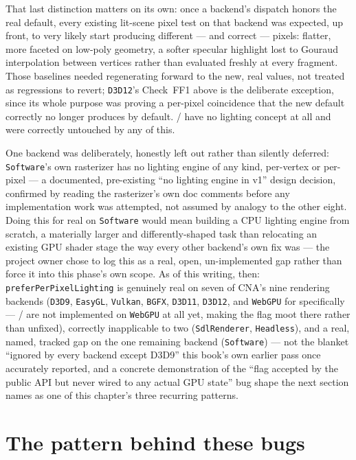 That last distinction matters on its own: once a backend's dispatch honors the real default,
every existing lit-scene pixel test on that backend was expected, up front, to very likely start
producing different --- and correct --- pixels: flatter, more faceted on low-poly geometry, a
softer specular highlight lost to Gouraud interpolation between vertices rather than evaluated
freshly at every fragment. Those baselines needed regenerating forward to the new, real values,
not treated as regressions to revert; \texttt{D3D12}'s Check~FF1 above is the deliberate
exception, since its whole purpose was proving a per-pixel coincidence that the new default
correctly no longer produces by default.  / 
have no lighting concept at all and were correctly untouched by any of this.

One backend was deliberately, honestly left out rather than silently deferred:
\texttt{Software}'s own rasterizer has no lighting engine of any kind, per-vertex or per-pixel
--- a documented, pre-existing ``no lighting engine in v1'' design decision, confirmed by reading
the rasterizer's own doc comments before any implementation work was attempted, not assumed by
analogy to the other eight. Doing this for real on \texttt{Software} would mean building a CPU
lighting engine from scratch, a materially larger and differently-shaped task than relocating an
existing GPU shader stage the way every other backend's own fix was --- the project owner chose
to log this as a real, open, un-implemented gap rather than force it into this phase's own scope.
As of this writing, then: \texttt{preferPerPixelLighting} is genuinely real on seven of CNA's
nine rendering backends (\texttt{D3D9}, \texttt{EasyGL}, \texttt{Vulkan}, \texttt{BGFX},
\texttt{D3D11}, \texttt{D3D12}, and \texttt{WebGPU} for  specifically ---
 /  are not implemented on \texttt{WebGPU}
at all yet, making the flag moot there rather than unfixed), correctly inapplicable to two
(\texttt{SdlRenderer}, \texttt{Headless}), and a real, named, tracked gap on the one remaining
backend (\texttt{Software}) --- not the blanket ``ignored by every backend except D3D9'' this
book's own earlier pass once accurately reported, and a concrete demonstration of the ``flag
accepted by the public API but never wired to any actual GPU state'' bug shape the next section
names as one of this chapter's three recurring patterns.

\section{The pattern behind these bugs}

